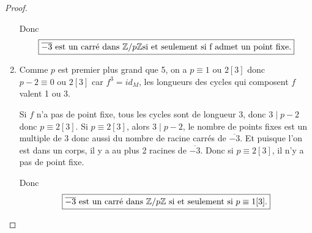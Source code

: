 \documentclass[12pt]{article}
\begin{document}
\begin{proof}
\begin{enumerate}
		Donc 
		\begin{equation}
			\boxed{\overline{-3}\text{ est un carré dans }\mathbb{Z}/p\mathbb{Z}\text{si et seulement si f admet un point fixe.}}
		\end{equation}

		\item Comme $p$ est premier plus grand que 5, on a $p\equiv 1\text{ ou }2[3]$ donc $p-2\equiv 0\text{ ou }2[3]$ car $f^{3}=id_{M}$, les longueurs des cycles qui composent $f$ valent 1 ou 3. 
		
		Si $f$ n'a pas de point fixe, tous les cycles sont de longueur 3, donc $3\mid p-2$ donc $p\equiv 2[3]$. Si $p\equiv 2[3]$, alors $3\mid p-2$, le nombre de points fixes est un multiple de $3$ donc aussi du nombre de racine carrés de $\overline{-3}$. Et puisque l'on est dans un corps, il y a au plus 2 racines de $\overline{-3}$. Donc si $p\equiv2[3]$, il n'y a pas de point fixe.

		Donc 
		\begin{equation}
			\boxed{\overline{-3}\text{ est un carré dans }\mathbb{Z}/p\mathbb{Z}\text{ si et seulement si }p\equiv1[3].}
		\end{equation}
	\end{enumerate}
\end{proof}
\end{document}
